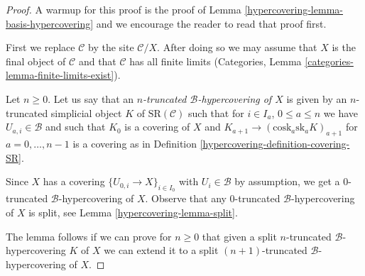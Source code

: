 \begin{proof}

A warmup for this proof is the proof of
Lemma \ref{hypercovering-lemma-basis-hypercovering} and
we encourage the reader to read that proof first.

\medskip\noindent
First we replace $\mathcal{C}$ by the site $\mathcal{C}/X$.
After doing so we may assume that $X$ is the final object
of $\mathcal{C}$ and that $\mathcal{C}$ has all finite limits
(Categories, Lemma \ref{categories-lemma-finite-limits-exist}).

\medskip\noindent
Let $n \geq 0$. Let us say that an
{\it $n$-truncated $\mathcal{B}$-hypercovering of $X$}
is given by an $n$-truncated simplicial object $K$
of $\text{SR}(\mathcal{C})$
such that for $i \in I_a$, $0 \leq a \leq n$
we have $U_{a, i} \in \mathcal{B}$ and such that
$K_0$ is a covering of $X$ and
$K_{a + 1} \to (\text{cosk}_a \text{sk}_a K)_{a + 1}$
for $a = 0, \ldots, n - 1$
is a covering as in Definition \ref{hypercovering-definition-covering-SR}.

\medskip\noindent
Since $X$ has a covering $\{U_{0, i} \to X\}_{i \in I_0}$
with $U_i \in \mathcal{B}$ by assumption, we get a $0$-truncated
$\mathcal{B}$-hypercovering of $X$. Observe that any $0$-truncated
$\mathcal{B}$-hypercovering of $X$ is split, see
Lemma \ref{hypercovering-lemma-split}.

\medskip\noindent
The lemma follows if we can prove for $n \geq 0$ that given a
split $n$-truncated $\mathcal{B}$-hypercovering $K$ of $X$
we can extend it to a
split $(n + 1)$-truncated $\mathcal{B}$-hypercovering of $X$.


\end{proof}
